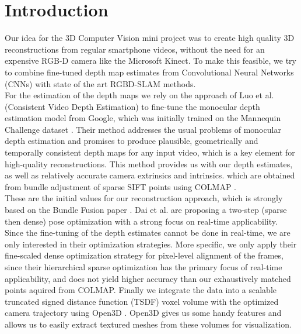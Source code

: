 \chapter{Introduction}
    Our idea for the 3D Computer Vision mini project was to create high quality 3D reconstructions from regular smartphone videos, without the need for an expensive RGB-D camera like the Microsoft Kinect.
    To make this feasible, we try to combine fine-tuned depth map estimates from Convolutional Neural Networks (CNNs) with state of the art RGBD-SLAM methods.\\
    For the estimation of the depth maps we rely on the approach of Luo et al. \cite{luo2020consistent} (Consistent Video Depth Estimation) to fine-tune the monocular depth estimation model from Google, which was initially trained on the Mannequin Challenge dataset \cite{mannequin}.
    Their method addresses the usual problems of monocular depth estimation and promises to produce plausible, geometrically and temporally consistent depth maps for any input video, which is a key element for high-quality reconstructions.
    This method provides us with our depth estimates, as well as relatively accurate camera extrinsics and intrinsics. which are obtained from bundle adjustment of sparse SIFT points using COLMAP \cite{colmap}.\\
    These are the initial values for our reconstruction approach, which is strongly based on the Bundle Fusion paper \cite{dai2017bundlefusion}.
    Dai et al. are proposing a two-step (sparse then dense) pose optimization with a strong focus on real-time applicability.
    Since the fine-tuning of the depth estimates cannot be done in real-time, we are only interested in their optimization strategies.
    More specific, we only apply their fine-scaled dense optimization strategy for pixel-level alignment of the frames, since their hierarchical sparse optimization has the primary focus of real-time applicability, and does not yield higher accuracy than our exhaustively matched points aquired from COLMAP.
    Finally we integrate the data into a scalable truncated signed distance function (TSDF) voxel volume with the optimized camera trajectory using Open3D \cite{open3d}. Open3D gives us some handy features and allows us to easily extract textured meshes from these volumes for visualization.
